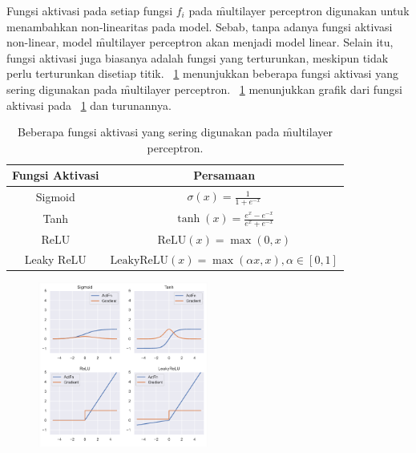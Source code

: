     Fungsi aktivasi pada setiap fungsi $f_i$ pada \f{multilayer perceptron} digunakan untuk menambahkan non-linearitas pada model. Sebab, tanpa adanya fungsi aktivasi non-linear, model \f{multilayer perceptron} akan menjadi model linear. Selain itu, fungsi aktivasi juga biasanya adalah fungsi yang terturunkan, meskipun tidak perlu terturunkan disetiap titik. \tab~\ref{tab:activation-function} menunjukkan beberapa fungsi aktivasi yang sering digunakan pada \f{multilayer perceptron}. \pic~\ref{fig:activation-function} menunjukkan grafik dari fungsi aktivasi pada \tab~\ref{tab:activation-function} dan turunannya.
    \begin{table}
        \centering
        \caption{Beberapa fungsi aktivasi yang sering digunakan pada \f{multilayer perceptron}.}
        \label{tab:activation-function}
        \begin{tabular}{|c|c|}
            \hline
            \textbf{Fungsi Aktivasi} & \textbf{Persamaan} \\
            \hline
            \hline
            Sigmoid & $\sigma(x) = \frac{1}{1 + e^{-x}}$ \\
            \hline
            Tanh & $\tanh(x) = \frac{e^x - e^{-x}}{e^x + e^{-x}}$ \\
            \hline
            ReLU & $\text{ReLU}(x) = \max(0, x)$ \\
            \hline
            Leaky ReLU & $\text{LeakyReLU}(x) = \max(\alpha x, x), \alpha \in [0, 1]$ \\
            \hline
        \end{tabular}
    \end{table}
    \begin{figure}
        \centering
        \includegraphics[width=0.5\textwidth]{assets/pics/act_function.png}
        \label{fig:activation-function}
    \end{figure}


